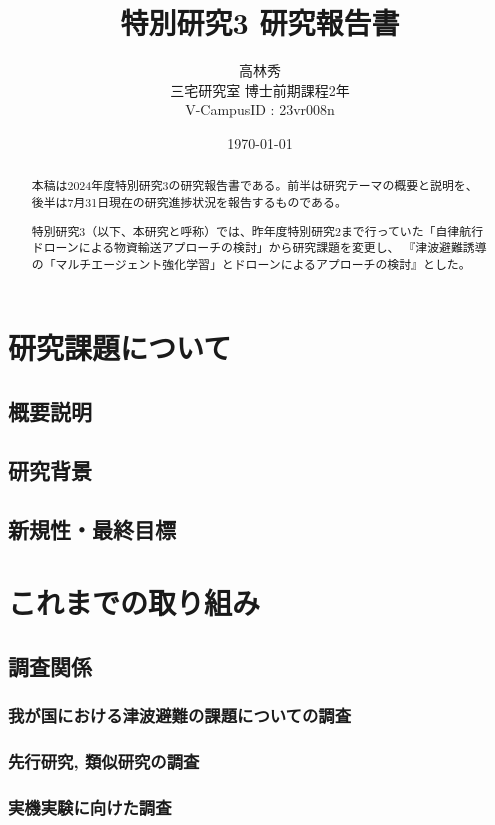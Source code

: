 \documentclass{article}[jsarticle]
\title{特別研究3 研究報告書}
\author{高林秀 \\ 三宅研究室 博士前期課程2年 \\ V-CampusID : 23vr008n}
\date{\today}
\begin{document}
\maketitle

\begin{abstract}
    \noindent
    本稿は2024年度特別研究3の研究報告書である。前半は研究テーマの概要と説明を、後半は7月31日現在の研究進捗状況を報告するものである。\par
    \noindent
    特別研究3（以下、本研究と呼称）では、昨年度特別研究2まで行っていた「自律航行ドローンによる物資輸送アプローチの検討」から研究課題を変更し、
    『津波避難誘導の「マルチエージェント強化学習」とドローンによるアプローチの検討』とした。\par 
    \noindent
\end{abstract}

\tableofcontents

\section{研究課題について}
\subsection{概要説明}
\subsection{研究背景}
\subsection{新規性・最終目標}
\section{これまでの取り組み}
\subsection{調査関係}
\subsubsection{我が国における津波避難の課題についての調査}
\subsubsection{先行研究, 類似研究の調査}
\subsubsection{実機実験に向けた調査}
\end{document}
